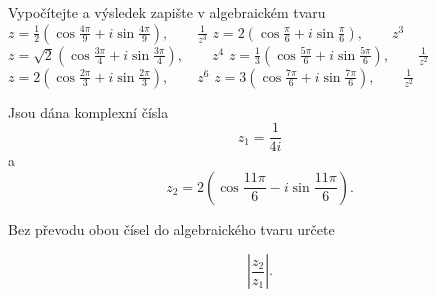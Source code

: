 \begin{exerciseblock}[2]{Vypočítejte a výsledek zapište v algebraickém tvaru}
    \task $\displaystyle
        z=\frac12\left(
            \cos\frac{4\pi}{9}
            +i\sin\frac{4\pi}{9}
        \right),
        \qquad
        \frac1{z^3}$
    \task $\displaystyle
        z=2\left(
            \cos\frac{\pi}{6}
            +i\sin\frac{\pi}{6}
        \right),
        \qquad
        z^3$
    \task $\displaystyle
        z=\sqrt2\left(
            \cos\frac{3\pi}{4}
            +i\sin\frac{3\pi}{4}
        \right),
        \qquad
        z^4$
    \task $\displaystyle
        z=\frac13\left(
            \cos\frac{5\pi}{6}
            +i\sin\frac{5\pi}{6}
        \right),
        \qquad
        \frac1{z^2}$
    \task $\displaystyle
        z=2\left(
            \cos\frac{2\pi}{3}
            +i\sin\frac{2\pi}{3}
        \right),
        \qquad
        z^6$
    \task $\displaystyle
        z=3\left(
            \cos\frac{7\pi}{6}
            +i\sin\frac{7\pi}{6}
        \right),
        \qquad
        \frac1{z^2}$
\end{exerciseblock}


\begin{exercise}{Jsou dána komplexní čísla
\[
    z_1=\frac{1}{4i}
\]
a
\[
    z_2=
    2\left(
        \cos\frac{11\pi}{6}
        -
        i\sin\frac{11\pi}{6}
    \right).
\]

Bez převodu obou čísel do algebraického tvaru určete

\[
    \left|\frac{z_2}{z_1}\right|.
\]
}
\end{exercise}



